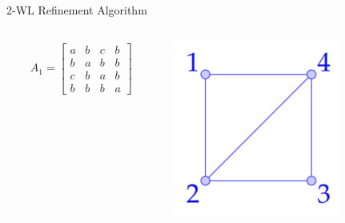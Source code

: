 \documentclass{beamer}
\begin{document}
\begin{frame}{2-WL Refinement Algorithm}
    \begin{columns}
        \begin{column}{0.7\textwidth}
        \begin{align*}
            A_1 = \begin{bmatrix}
                a&b&c&b\\
                b&a&b&b\\
                c&b&a&b\\
                b&b&b&a
            \end{bmatrix}
        \end{align*}
        \end{column}

        \begin{column}{0.3\textwidth}
            \centering
            \includegraphics[width=0.7\textwidth]{slides/pic_1.jpg}
        \end{column}
    \end{columns}
    
    \vspace{1em}
    
\end{frame}
\addtocounter{framenumber}{-1}
\end{document}
